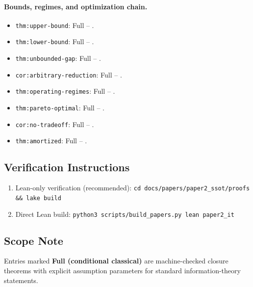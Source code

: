 \paragraph{Bounds, regimes, and optimization chain.}
\begin{itemize}
\item \nolinkurl{thm:upper-bound}: Full -- .
\item \nolinkurl{thm:lower-bound}: Full -- .
\item \nolinkurl{thm:unbounded-gap}: Full -- .
\item \nolinkurl{cor:arbitrary-reduction}: Full -- .
\item \nolinkurl{thm:operating-regimes}: Full -- .
\item \nolinkurl{thm:pareto-optimal}: Full -- .
\item \nolinkurl{cor:no-tradeoff}: Full -- .
\item \nolinkurl{thm:amortized}: Full -- .
\end{itemize}
\endgroup

\subsection*{Verification Instructions}

\begin{enumerate}
\item Lean-only verification (recommended):
\texttt{cd docs/papers/paper2\_ssot/proofs \&\& lake build}
\item Direct Lean build:
\texttt{python3 scripts/build\_papers.py lean paper2\_it}
\end{enumerate}

\subsection*{Scope Note}

Entries marked \textbf{Full (conditional classical)} are machine-checked closure theorems with explicit assumption parameters for standard information-theory statements.
